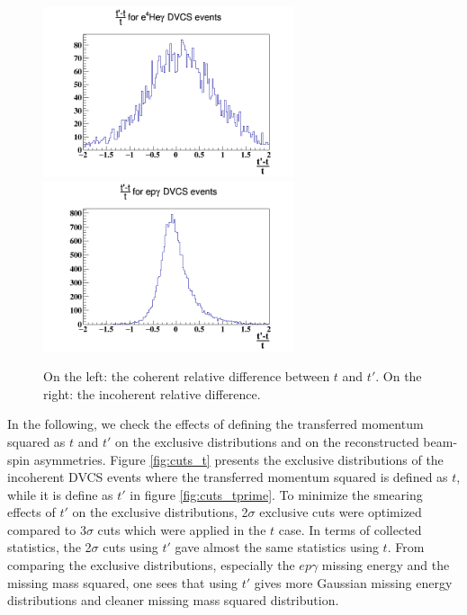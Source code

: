 \begin{figure}[h!]
\includegraphics[height=5.0cm]{fig-incoh/T_tprime_Coh.png}
\includegraphics[height=5.0cm]{fig-incoh/T_tprime_InCoh.png}
\caption{On the left: the coherent relative difference between $t$ and $t'$.  
On the right: the incoherent relative difference.}
\label{fig:tprime}
\end{figure}

In the following, we check the effects of defining the transferred momentum 
squared as $t$ and $t'$ on the exclusive distributions and on the reconstructed 
beam-spin asymmetries. Figure \ref{fig:cuts_t} presents the exclusive 
distributions of the incoherent DVCS events where the transferred momentum
squared is defined as $t$, while it is define as $t'$ in figure 
\ref{fig:cuts_tprime}. To minimize the smearing effects of $t'$ on the 
exclusive distributions, 2$\sigma$ exclusive cuts were optimized compared to 
3$\sigma$ cuts which were applied in the $t$ case. In terms of collected 
statistics, the 2$\sigma$ cuts using $t'$ gave almost the same statistics using 
$t$. From comparing the exclusive distributions, especially the $ep\gamma$ 
missing energy and the missing mass squared, one sees that using $t'$ gives 
more Gaussian missing energy distributions and cleaner missing mass squared 
distribution.\\      

